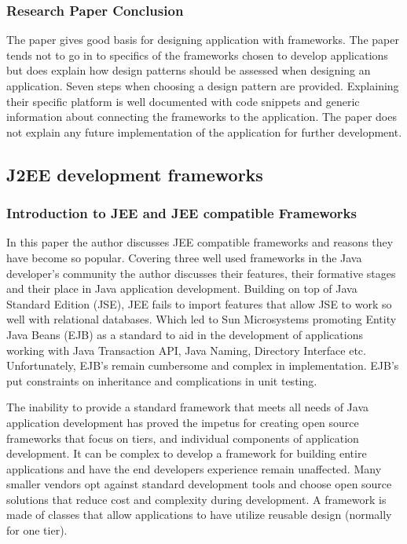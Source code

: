 \documentclass{article}
\begin{document}
		\subsubsection{Research Paper Conclusion}
		The paper gives good basis for designing application with frameworks. The paper tends not to go in to specifics of the frameworks chosen to develop applications but does explain how design patterns should be assessed when designing an application. Seven steps when choosing a design pattern are provided. Explaining their specific platform is well documented with code snippets and generic information about connecting the frameworks to the application. The paper does not explain any future implementation of the application for further development.

	\subsection{J2EE development frameworks}
	
		\subsubsection{Introduction to JEE and JEE compatible Frameworks}
		In this paper the author discusses JEE compatible frameworks and reasons they have become so popular. Covering three well used frameworks in the Java developer’s community the author discusses their features, their formative stages and their place in Java application development. Building on top of Java Standard Edition (JSE), JEE fails to import features that allow JSE to work so well with relational databases. Which led to Sun Microsystems promoting Entity Java Beans (EJB) as a standard to aid in the development of applications working with Java Transaction API, Java Naming, Directory Interface etc. Unfortunately, EJB’s remain cumbersome and complex in implementation. EJB’s put constraints on inheritance and complications in unit testing. 
		
		The inability to provide a standard framework that meets all needs of Java application development has proved the impetus for creating open source frameworks that focus on tiers, and individual components of application development. It can be complex to develop a framework for building entire applications and have the end developers experience remain unaffected. Many smaller vendors opt against standard development tools and choose open source solutions that reduce cost and complexity during development. A framework is made of classes that allow applications to have utilize reusable design (normally for one tier).
		
\end{document}
